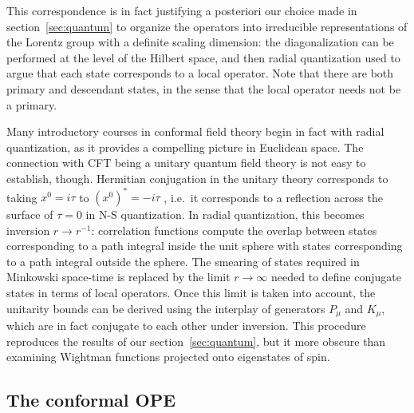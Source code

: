 \documentclass[a4paper,12pt]{article}
\numberwithin{equation}{section}
\begin{document}
This correspondence is in fact justifying a posteriori our choice made in section~\ref{sec:quantum} to organize the operators into irreducible representations of the Lorentz group with a definite scaling dimension: the diagonalization can be performed at the level of the Hilbert space, and then radial quantization used to argue that each state corresponds to a local operator.
Note that there are both primary and descendant states, in the sense that the local operator needs not be a primary.

Many introductory courses in conformal field theory begin in fact with radial quantization, as it provides a compelling picture in Euclidean space. The connection with CFT being a unitary quantum field theory is not easy to establish, though. Hermitian conjugation in the unitary theory corresponds to taking $x^0 = i \tau$ to $(x^0)^* = -i \tau$ , i.e.~it corresponds to a reflection across the surface of $\tau = 0$ in N-S quantization. In radial quantization, this becomes inversion $r \to r^{-1}$: correlation functions compute the overlap between states corresponding to a path integral inside the unit sphere with states corresponding to a path integral outside the sphere. The smearing of states required in Minkowski space-time is replaced by the limit $r \to \infty$ needed to define conjugate states in terms of local operators.
Once this limit is taken into account, the unitarity bounds can be derived using the interplay of generators $P_\mu$ and $K_\mu$, which are in fact conjugate to each other under inversion. This procedure reproduces the results of our section~\ref{sec:quantum}, but it more obscure than examining Wightman functions projected onto eigenstates of spin.


\subsection{The conformal OPE}
\end{document}
